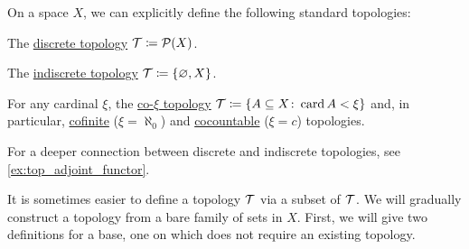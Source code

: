 \begin{definition}\label{def:standard_topologies}
  On a space $X$, we can explicitly define the following standard topologies:
  \begin{defenum}
    \item\label{def:standard_topologies/discrete} The \ul{discrete topology} $\mathcal T \coloneqq \operatorname{\mathcal P}(X)$.
    \item\label{def:standard_topologies/indiscrete} The \ul{indiscrete topology} $\mathcal T \coloneqq \{ \varnothing, X \}$.
    \item\label{def:standard_topologies/co_cardinal} For any cardinal $\xi$, the \ul{co-$\xi$ topology} $\mathcal T \coloneqq \{ A \subseteq X \colon \operatorname{card} A < \xi \}$ and, in particular, \ul{cofinite} ($\xi = \aleph_0$) and \ul{cocountable} ($\xi = c$) topologies.
  \end{defenum}

  For a deeper connection between discrete and indiscrete topologies, see \cref{ex:top_adjoint_functor}.
\end{definition}

\begin{note}\label{note:abritrary_family_to_topology}
  It is sometimes easier to define a topology $\mathcal T$ via a subset of $\mathcal T$. We will gradually construct a topology from a bare family of sets in $X$. First, we will give two definitions for a base, one on which does not require an existing topology.
\end{note}

